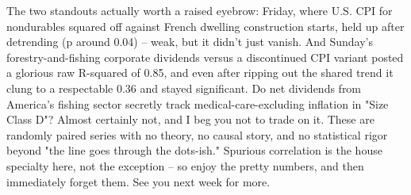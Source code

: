 The two standouts actually worth a raised eyebrow: Friday, where U.S. CPI for nondurables squared off against French dwelling construction starts, held up after detrending (p around 0.04) -- weak, but it didn't just vanish. And Sunday's forestry-and-fishing corporate dividends versus a discontinued CPI variant posted a glorious raw R-squared of 0.85, and even after ripping out the shared trend it clung to a respectable 0.36 and stayed significant. Do net dividends from America's fishing sector secretly track medical-care-excluding inflation in "Size Class D"? Almost certainly not, and I beg you not to trade on it. These are randomly paired series with no theory, no causal story, and no statistical rigor beyond "the line goes through the dots-ish." Spurious correlation is the house specialty here, not the exception -- so enjoy the pretty numbers, and then immediately forget them. See you next week for more.
